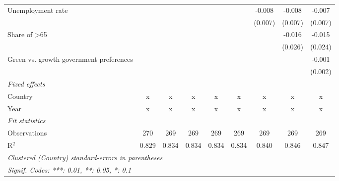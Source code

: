 \begin{table}[htbp]
\begin{tabular}{lcccccccc}
      Unemployment rate                                        &         &         &         &         &         & -0.008  & -0.008  & -0.007\\   
                                                               &         &         &         &         &         & (0.007) & (0.007) & (0.007)\\   
      Share of >65                                             &         &         &         &         &         &         & -0.016  & -0.015\\   
                                                               &         &         &         &         &         &         & (0.026) & (0.024)\\   
      Green vs. growth government preferences                  &         &         &         &         &         &         &         & -0.001\\   
                                                               &         &         &         &         &         &         &         & (0.002)\\   
      \emph{Fixed effects}\\
      Country                                                  & x       & x       & x       & x       & x       & x       & x       & x\\  
      Year                                                     & x       & x       & x       & x       & x       & x       & x       & x\\  
      \midrule \emph{Fit statistics}\\
      Observations                                             & 270     & 269     & 269     & 269     & 269     & 269     & 269     & 269\\  
      R$^2$                                                    & 0.829   & 0.834   & 0.834   & 0.834   & 0.834   & 0.840   & 0.846   & 0.847\\  
      \midrule
      \multicolumn{9}{l}{\emph{Clustered (Country) standard-errors in parentheses}}\\
      \multicolumn{9}{l}{\emph{Signif. Codes: ***: 0.01, **: 0.05, *: 0.1}}\\
   \end{tabular}
\end{table}


